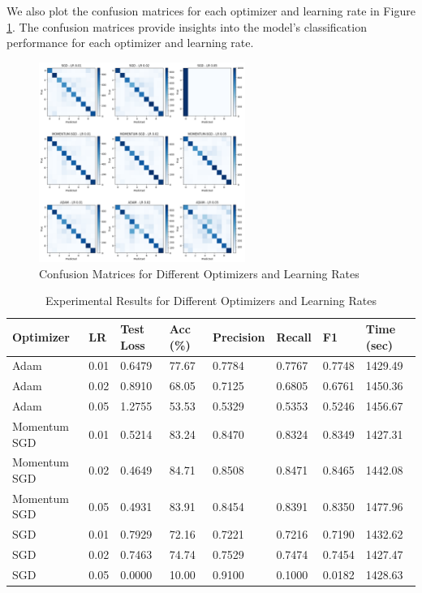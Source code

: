 \documentclass{article}
\begin{document}
We also plot the confusion matrices for each optimizer and learning rate in Figure \ref{fig:conf_matrices}. The confusion matrices provide insights into the model's classification performance for each optimizer and learning rate. 

\begin{figure}
  \centering
  \includegraphics[width=0.6\textwidth]{images/q4_conf_matrices.png}
  \caption{Confusion Matrices for Different Optimizers and Learning Rates}
  \label{fig:conf_matrices}
\end{figure}


\begin{table}[ht]
  \centering
  \begin{tabular}{|l|l|l|l|l|l|l|l|}
    \hline
    \textbf{Optimizer} & \textbf{LR} & \textbf{Test Loss} & \textbf{Acc (\%)} & \textbf{Precision} & \textbf{Recall} & \textbf{F1} & \textbf{Time (sec)} \\
    \hline
    Adam & 0.01 & 0.6479 & 77.67 & 0.7784 & 0.7767 & 0.7748 & 1429.49 \\
    Adam & 0.02 & 0.8910 & 68.05 & 0.7125 & 0.6805 & 0.6761 & 1450.36 \\
    Adam & 0.05 & 1.2755 & 53.53 & 0.5329 & 0.5353 & 0.5246 & 1456.67 \\
    \hline
    Momentum SGD & 0.01 & 0.5214 & 83.24 & 0.8470 & 0.8324 & 0.8349 & 1427.31 \\
    Momentum SGD & 0.02 & 0.4649 & 84.71 & 0.8508 & 0.8471 & 0.8465 & 1442.08 \\
    Momentum SGD & 0.05 & 0.4931 & 83.91 & 0.8454 & 0.8391 & 0.8350 & 1477.96 \\
    \hline
    SGD & 0.01 & 0.7929 & 72.16 & 0.7221 & 0.7216 & 0.7190 & 1432.62 \\
    SGD & 0.02 & 0.7463 & 74.74 & 0.7529 & 0.7474 & 0.7454 & 1427.47 \\
    SGD & 0.05 & 0.0000 & 10.00 & 0.9100 & 0.1000 & 0.0182 & 1428.63 \\
    \hline
  \end{tabular}
  \caption{Experimental Results for Different Optimizers and Learning Rates}
  \label{tab:exp_results}
\end{table}  
\end{document}
